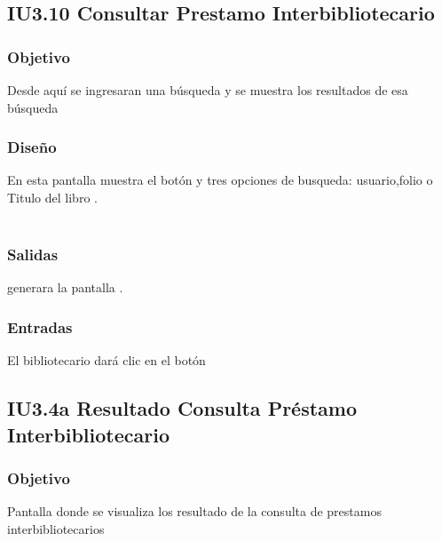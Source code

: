 \newpage
\subsection{IU3.10 Consultar Prestamo Interbibliotecario}

\subsubsection{Objetivo}
	Desde aquí se ingresaran una búsqueda y se muestra los resultados de esa búsqueda

\subsubsection{Diseño}
	En esta pantalla muestra el botón  y tres opciones de busqueda: usuario,folio o Titulo del libro .  \\\\


\subsubsection{Salidas}
	\begin{Citemize}
		\item generara la pantalla . 
	\end{Citemize}
	
\subsubsection{Entradas}
	\begin{Citemize}
		\item El bibliotecario dará clic en el botón \IUbutton{Buscar}
	\end{Citemize}




\subsection{IU3.4a Resultado Consulta Préstamo Interbibliotecario}

\subsubsection{Objetivo}
	Pantalla donde se visualiza los resultado de la consulta de prestamos interbibliotecarios

